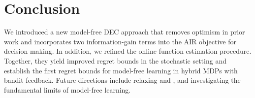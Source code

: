 
\section{Conclusion}
We introduced a new model-free DEC approach that removes optimism in prior work and incorporates two information-gain terms into the AIR objective for decision making. In addition, we refined the online function estimation procedure. Together, they yield improved regret bounds in the stochastic setting and establish the first regret bounds for model-free learning in hybrid MDPs with bandit feedback. Future directions include relaxing  and , and investigating the fundamental limits of model-free learning.
\clearpage